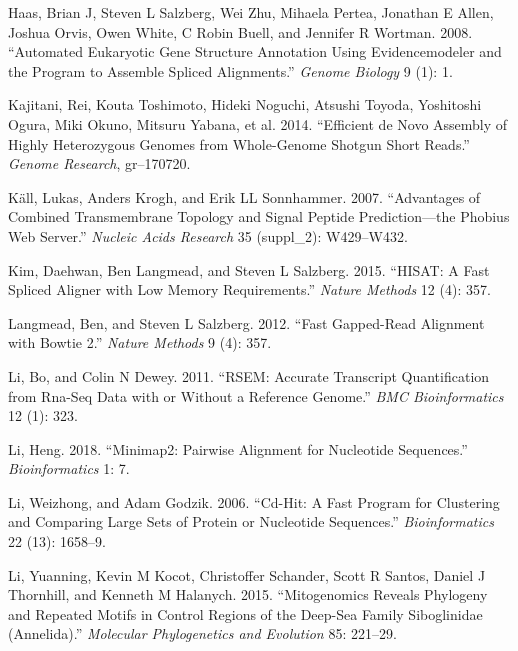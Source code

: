 \documentclass[]{article}
\begin{document}
\leavevmode\hypertarget{ref-haas2008automated}{}%
Haas, Brian J, Steven L Salzberg, Wei Zhu, Mihaela Pertea, Jonathan E
Allen, Joshua Orvis, Owen White, C Robin Buell, and Jennifer R Wortman.
2008. ``Automated Eukaryotic Gene Structure Annotation Using
Evidencemodeler and the Program to Assemble Spliced Alignments.''
\emph{Genome Biology} 9 (1): 1.

\leavevmode\hypertarget{ref-kajitani2014efficient}{}%
Kajitani, Rei, Kouta Toshimoto, Hideki Noguchi, Atsushi Toyoda,
Yoshitoshi Ogura, Miki Okuno, Mitsuru Yabana, et al. 2014. ``Efficient
de Novo Assembly of Highly Heterozygous Genomes from Whole-Genome
Shotgun Short Reads.'' \emph{Genome Research}, gr--170720.

\leavevmode\hypertarget{ref-kall2007advantages}{}%
Käll, Lukas, Anders Krogh, and Erik LL Sonnhammer. 2007. ``Advantages of
Combined Transmembrane Topology and Signal Peptide Prediction---the
Phobius Web Server.'' \emph{Nucleic Acids Research} 35 (suppl\_2):
W429--W432.

\leavevmode\hypertarget{ref-kim2015hisat}{}%
Kim, Daehwan, Ben Langmead, and Steven L Salzberg. 2015. ``HISAT: A Fast
Spliced Aligner with Low Memory Requirements.'' \emph{Nature Methods} 12
(4): 357.

\leavevmode\hypertarget{ref-langmead2012fast}{}%
Langmead, Ben, and Steven L Salzberg. 2012. ``Fast Gapped-Read Alignment
with Bowtie 2.'' \emph{Nature Methods} 9 (4): 357.

\leavevmode\hypertarget{ref-li2011rsem}{}%
Li, Bo, and Colin N Dewey. 2011. ``RSEM: Accurate Transcript
Quantification from Rna-Seq Data with or Without a Reference Genome.''
\emph{BMC Bioinformatics} 12 (1): 323.

\leavevmode\hypertarget{ref-li2018minimap2}{}%
Li, Heng. 2018. ``Minimap2: Pairwise Alignment for Nucleotide
Sequences.'' \emph{Bioinformatics} 1: 7.

\leavevmode\hypertarget{ref-li2006cd}{}%
Li, Weizhong, and Adam Godzik. 2006. ``Cd-Hit: A Fast Program for
Clustering and Comparing Large Sets of Protein or Nucleotide
Sequences.'' \emph{Bioinformatics} 22 (13): 1658--9.

\leavevmode\hypertarget{ref-li2015mitogenomics}{}%
Li, Yuanning, Kevin M Kocot, Christoffer Schander, Scott R Santos,
Daniel J Thornhill, and Kenneth M Halanych. 2015. ``Mitogenomics Reveals
Phylogeny and Repeated Motifs in Control Regions of the Deep-Sea Family
Siboglinidae (Annelida).'' \emph{Molecular Phylogenetics and Evolution}
85: 221--29.
\end{document}
